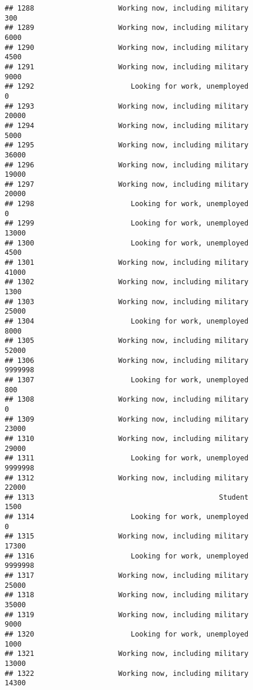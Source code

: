 \documentclass[]{book}
\theoremstyle{definition}
\theoremstyle{definition}
\theoremstyle{remark}
\begin{document}
\begin{verbatim}
## 1288                    Working now, including military             300
## 1289                    Working now, including military            6000
## 1290                    Working now, including military            4500
## 1291                    Working now, including military            9000
## 1292                       Looking for work, unemployed               0
## 1293                    Working now, including military           20000
## 1294                    Working now, including military            5000
## 1295                    Working now, including military           36000
## 1296                    Working now, including military           19000
## 1297                    Working now, including military           20000
## 1298                       Looking for work, unemployed               0
## 1299                       Looking for work, unemployed           13000
## 1300                       Looking for work, unemployed            4500
## 1301                    Working now, including military           41000
## 1302                    Working now, including military            1300
## 1303                    Working now, including military           25000
## 1304                       Looking for work, unemployed            8000
## 1305                    Working now, including military           52000
## 1306                    Working now, including military         9999998
## 1307                       Looking for work, unemployed             800
## 1308                    Working now, including military               0
## 1309                    Working now, including military           23000
## 1310                    Working now, including military           29000
## 1311                       Looking for work, unemployed         9999998
## 1312                    Working now, including military           22000
## 1313                                            Student            1500
## 1314                       Looking for work, unemployed               0
## 1315                    Working now, including military           17300
## 1316                       Looking for work, unemployed         9999998
## 1317                    Working now, including military           25000
## 1318                    Working now, including military           35000
## 1319                    Working now, including military            9000
## 1320                       Looking for work, unemployed            1000
## 1321                    Working now, including military           13000
## 1322                    Working now, including military           14300

\end{verbatim}
\end{document}
